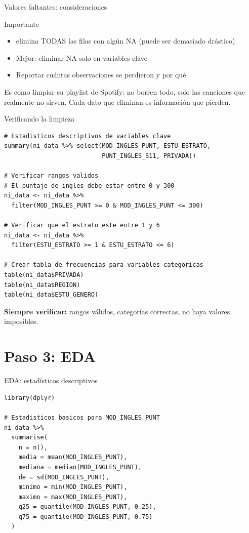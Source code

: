 \documentclass[aspectratio=169, 11pt]{beamer}
\begin{document}
\begin{frame}{Valores faltantes: consideraciones}
\begin{alertblock}{Importante}
\begin{itemize}
\item {} elimina TODAS las filas con alg\'un NA (puede ser demasiado dr\'astico)
\item Mejor: eliminar NA solo en variables clave
\item Reportar cu\'antas observaciones se perdieron y por qu\'e
\end{itemize}

\small
Es como limpiar su playlist de Spotify: no borren todo, solo las canciones que realmente no sirven. Cada dato que eliminan es informaci\'on que pierden.
\end{alertblock}
\end{frame}

\begin{frame}[fragile]{Verificando la limpieza}
\begin{lstlisting}
# Estadisticos descriptivos de variables clave
summary(ni_data %>% select(MOD_INGLES_PUNT, ESTU_ESTRATO,
                           PUNT_INGLES_S11, PRIVADA))

# Verificar rangos validos
# El puntaje de ingles debe estar entre 0 y 300
ni_data <- ni_data %>%
  filter(MOD_INGLES_PUNT >= 0 & MOD_INGLES_PUNT <= 300)

# Verificar que el estrato este entre 1 y 6
ni_data <- ni_data %>%
  filter(ESTU_ESTRATO >= 1 & ESTU_ESTRATO <= 6)

# Crear tabla de frecuencias para variables categoricas
table(ni_data$PRIVADA)
table(ni_data$REGION)
table(ni_data$ESTU_GENERO)
\end{lstlisting}

\footnotesize
\textbf{Siempre verificar:} rangos v\'alidos, categor\'ias correctas, no haya valores imposibles.
\end{frame}

\section{Paso 3: EDA}

\begin{frame}[fragile]{EDA: estadísticos descriptivos}
\begin{lstlisting}
library(dplyr)

# Estadisticos basicos para MOD_INGLES_PUNT
ni_data %>%
  summarise(
    n = n(),
    media = mean(MOD_INGLES_PUNT),
    mediana = median(MOD_INGLES_PUNT),
    de = sd(MOD_INGLES_PUNT),
    minimo = min(MOD_INGLES_PUNT),
    maximo = max(MOD_INGLES_PUNT),
    q25 = quantile(MOD_INGLES_PUNT, 0.25),
    q75 = quantile(MOD_INGLES_PUNT, 0.75)
  )
\end{lstlisting}
\end{frame}
\end{document}
